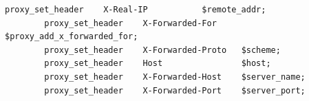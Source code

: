 	\begin{lstlisting}[label=lst:confProx, caption=Wspólna konfiguracja lokalizacji proxy, float=h]
		proxy_set_header    X-Real-IP           $remote_addr;
		proxy_set_header    X-Forwarded-For     $proxy_add_x_forwarded_for;
		proxy_set_header    X-Forwarded-Proto   $scheme;
		proxy_set_header    Host                $host;
		proxy_set_header    X-Forwarded-Host    $server_name;
		proxy_set_header    X-Forwarded-Port    $server_port;
	\end{lstlisting}